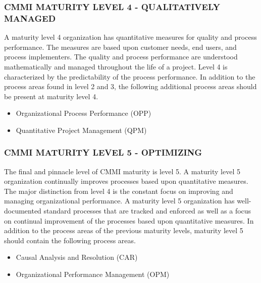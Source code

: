 \documentclass[SDSUThesis.tex]{subfiles}
\begin{document}
\subsubsection{CMMI MATURITY LEVEL 4 - QUALITATIVELY MANAGED}
    A maturity level 4 organization has quantitative measures for quality and process performance. 
    The measures are based upon customer needs, end users, and process implementers.  The quality
    and process performance are understood mathematically and managed throughout the life of a project.
    Level 4 is characterized by the predictability of the process performance. In addition to
    the process areas found in level 2 and 3, the following additional process areas should be present
    at maturity level 4.
    \begin{itemize}
        \item Organizational Process Performance (OPP)
        \item Quantitative Project Management (QPM)
    \end{itemize}
\subsubsection{CMMI MATURITY LEVEL 5 - OPTIMIZING} 
    The final and pinnacle level of CMMI maturity is level 5.  A maturity level 5 organization
    continually improves processes based upon quantitative measures.  The major distinction from 
    level 4 is the constant focus on improving and managing organizational performance.  A maturity level
    5 organization has well-documented standard processes that are tracked and enforced as well as
    a focus on continual improvement of the processes based upon 
    quantitative measures.  In addition to the process areas of the previous maturity levels, maturity
    level 5 should contain the following process areas.
    \begin{itemize}
        \item Causal Analysis and Resolution (CAR)
        \item Organizational Performance Management (OPM)
    \end{itemize}
\end{document}
